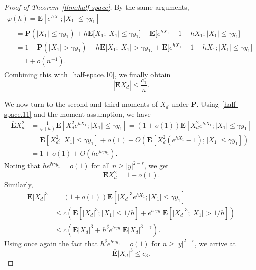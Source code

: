 \documentclass[AHL,Unicode,longabstracts,published]{cedram}
\newcommand{\pr}{\mathbf{P}}
\newcommand{\e}{\mathbf{E}}
\renewcommand{\le}{\leqslant}
\renewcommand{\ge}{\geqslant}
\begin{document}
\begin{proof}[Proof of Theorem~\ref{thm:half-space}]
By the same arguments,
\begin{multline}\label{half-space.11}
\varphi(h)=\e\left[e^{hX_1};|X_1|\le\gamma y_1\right]\\
\begin{aligned}
&=\pr\left(|X_1|\le \gamma y_1\right)+h\e\big[X_1;|X_1|\le\gamma y_1\big] +\e\big[e^{hX_1}-1-hX_1;|X_1|\le\gamma y_1\big]\\
&=1-\pr\left(|X_1|> \gamma y_1\right)-h\e\big[X_1;|X_1|>\gamma y_1\big] +\e\big[e^{hX_1}-1-hX_1;|X_1|\le\gamma y_1\big]\\
&=1+o\left(n^{-1}\right).
\end{aligned}
\end{multline}
Combining this with~\eqref{half-space.10}, we finally obtain
\begin{equation}\label{half-space.12}
\left|\overline{\e}X_d\right|\le\frac{c_1}{n}.
\end{equation}

We now turn to the second and third moments of $X_d$ under $\overline{\pr}$. Using~\eqref{half-space.11} and the moment assumption, we have
\begin{align*}
\overline{\e}X_d^2&=\frac{1}{\varphi(h)}\e\left[X_d^2e^{hX_1};|X_1|\le\gamma y_1\right] =\left(1+o(1)\right)\e\left[X_d^2e^{hX_1};|X_1|\le\gamma y_1\right]\\
&=\e\left[X_d^2;|X_1|\le\gamma y_1\right]+o(1)+O\left(\e\left[X_d^2\left(e^{hX_1}-1\right);|X_1|\le\gamma y_1\right]\right)\\
&=1+o(1)+O\left(he^{h\gamma y_1}\right).
\end{align*}
Noting that $he^{h\gamma y_1}=o(1)$ for all $n\ge|y|^{2-r}$, we get
\begin{equation}\label{half-space.13}
\overline{\e}X_d^2=1+o(1).
\end{equation}
Similarly,
\begin{align*}
\overline{\e}|X_d|^3&=(1+o(1))\e\left[|X_d|^3e^{hX_1};|X_1|\le\gamma y_1\right]\\
&\le c\left(\e\left[|X_d|^3;|X_1|\le 1/h\right]+e^{h\,\gamma y_1}\e\left[\left|X_d\right|^3;| X_1|>1/h\right]\right)\\
&\le c\left(\e|X_d|^3+h^\delta e^{h\gamma y_1}\e| X_d|^{3+\gamma}\right).
\end{align*}
Using once again the fact that $h^\delta e^{h\gamma y_1}=o(1)$ for $n\ge| y|^{2-r}$, we arrive at
\begin{equation}\label{half-space.14}
\overline{\e}|X_d|^3\le c_3.
\end{equation}


\end{proof}
\end{document}

